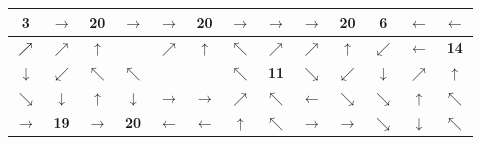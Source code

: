 \begin{center}
\begin{minipage}{\textwidth}
\renewcommand{\arraystretch}{1.4}
\begin{table}[H]
\centering 
\begin{scriptsize}
\begin{tabular}{|>{}c|>{}c|>{}c|>{}c|>{}c|>{}c|>{}c|>{}c|>{}c|>{}c|>{}c|>{}c|>{}c|}
\hline
\bf{3}&\cellcolor{red!15!white}$\rightarrow$&\cellcolor{red!15!white}\bf{20}&\cellcolor{blue!15!white}$\rightarrow$&
\cellcolor{blue!15!white}$\rightarrow$&\cellcolor{blue!15!white}\bf{20}&\cellcolor{green!15!white}$\rightarrow$&\cellcolor{green!15!white}$\rightarrow$&\cellcolor{green!15!white}$\rightarrow$&\cellcolor{green!15!white}\bf{20}&\cellcolor{yellow!15!white}\bf{6}&\cellcolor{yellow!15!white}$\leftarrow$&\cellcolor{yellow!15!white}$\leftarrow$\\
\hline
$\cellcolor{red!15!white}\nearrow$&\cellcolor{red!15!white}$\nearrow$&\cellcolor{red!15!white}$\uparrow$&\cellcolor{gray!50!white} &
\cellcolor{blue!15!white}$\nearrow$&\cellcolor{blue!15!white}$\uparrow$&\cellcolor{blue!15!white}$\nwarrow$&\cellcolor{green!15!white}$\nearrow$&\cellcolor{green!15!white}$\nearrow$&
\cellcolor{green!15!white}$\uparrow$&\cellcolor{blue!15!white}$\swarrow$&\cellcolor{blue!15!white}$\leftarrow$&\cellcolor{red!15!white}\bf{14} \\
\hline
\cellcolor{green!15!white}$\downarrow$&\cellcolor{green!15!white}$\swarrow$&\cellcolor{red!15!white}$\nwarrow$&\cellcolor{red!15!white}$\nwarrow$&
\cellcolor{gray!50!white} &\cellcolor{gray!50!white} &\cellcolor{blue!15!white}$\nwarrow$&\cellcolor{yellow!15!white}\bf{11}&$\searrow$ &\cellcolor{blue!15!white}$\swarrow$&$\downarrow$&\cellcolor{red!15!white}$\nearrow$&\cellcolor{red!15!white}$\uparrow$ \\
\hline
\cellcolor{green!15!white}$\searrow$&\cellcolor{green!15!white}$\downarrow$&\cellcolor{red!15!white}$\uparrow$&\cellcolor{blue!15!white}$\downarrow$&\cellcolor{yellow!15!white}
$\rightarrow$&\cellcolor{yellow!15!white}$\rightarrow$&\cellcolor{yellow!15!white}$\nearrow$&\cellcolor{blue!15!white}$\nwarrow$&\cellcolor{blue!15!white}$\leftarrow$ 
&$\searrow$&$\searrow$&\cellcolor{red!15!white}$\uparrow$&\cellcolor{red!15!white}$\nwarrow$ \\
\hline
\cellcolor{green!15!white}$\rightarrow$&\cellcolor{green!15!white}\bf{19}&\cellcolor{blue!15!white}$\rightarrow$&\cellcolor{blue!15!white}\bf{20}&
\cellcolor{blue!15!white}$\leftarrow$&\cellcolor{blue!15!white}$\leftarrow$&\cellcolor{yellow!15!white}$\uparrow$&\cellcolor{yellow!15!white}$\nwarrow$&$\rightarrow$ &$\rightarrow$&$\searrow$&$\downarrow$&\cellcolor{red!15!white}$\nwarrow$\\

\end{tabular}
\end{scriptsize}
\end{table}
\end{minipage}
\end{center}
